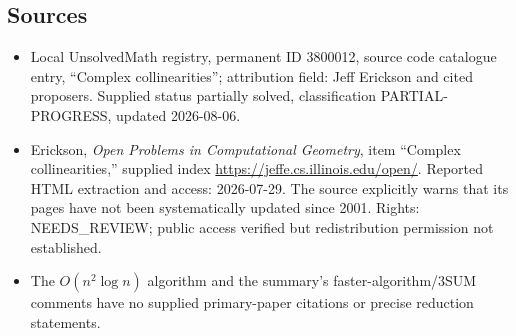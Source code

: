\documentclass[11pt]{article}
\begin{document}
\subsection{Sources}
\begin{itemize}
\item Local UnsolvedMath registry, permanent ID 3800012, source code catalogue entry, ``Complex collinearities''; attribution field: Jeff Erickson and cited proposers. Supplied status partially solved, classification PARTIAL-PROGRESS, updated 2026-08-06.
\item Erickson, \emph{Open Problems in Computational Geometry}, item ``Complex collinearities,'' supplied index \url{https://jeffe.cs.illinois.edu/open/}. Reported HTML extraction and access: 2026-07-29. The source explicitly warns that its pages have not been systematically updated since 2001. Rights: NEEDS\_REVIEW; public access verified but redistribution permission not established.
\item The $O(n^2\log n)$ algorithm and the summary's faster-algorithm/3SUM comments have no supplied primary-paper citations or precise reduction statements.
\end{itemize}
\end{document}
